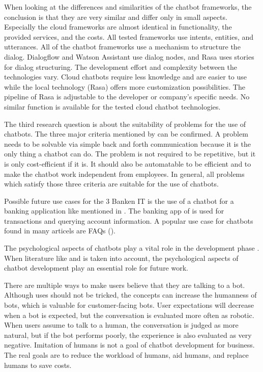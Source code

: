 When looking at the differences and similarities of the chatbot frameworks, the conclusion is that they are very similar and differ only in small aspects.
Especially the cloud frameworks are almost identical in functionality, the provided services, and the costs.
All tested frameworks use intents, entities, and utterances.
All of the chatbot frameworks use a mechanism to structure the dialog.
Dialogflow and Watson Assistant use dialog nodes, and Rasa uses stories for dialog structuring.
The development effort and complexity between the technologies vary.
Cloud chatbots require less knowledge and are easier to use while the local technology (Rasa) offers more customization possibilities.
The pipeline of Rasa is adjustable to the developer or company's specific needs.
No similar function is available for the tested cloud chatbot technologies.

The third research question is about the suitability of problems for the use of chatbots.
The three major criteria mentioned by \citet{singhbuilding} can be confirmed.
A problem needs to be solvable via simple back and forth communication because it is the only thing a chatbot can do.
The problem is not required to be repetitive, but it is only cost-efficient if it is.
It should also be automatable to be efficient and to make the chatbot work independent from employees.
In general, all problems which satisfy those three criteria are suitable for the use of chatbots.

Possible future use cases for the 3 Banken IT is the use of a chatbot for a banking application like mentioned in \citet{singhbuilding}.
The banking app of \citet{singhbuilding} is used for transactions and querying account information.
A popular use case for chatbots found in many articels are FAQs (\citet{evaluateChatbotsShawar2007, buiildChatbotsPython, huang2007extracting, GO2019304}).

The psychological aspects of chatbots play a vital role in the development phase \cite{GO2019304}.
When literature like \citet{folstad2017chatbots, brandtzaeg2018chatbots} and \citet{GO2019304} is taken into account, the psychological aspects of chatbot development play an essential role for future work.

There are multiple ways to make users believe that they are talking to a bot.
Although uses should not be tricked, the concepts can increase the humanness of bots, which is valuable for customer-facing bots.
User expectations will decrease when a bot is expected, but the conversation is evaluated more often as robotic.
When users assume to talk to a human, the conversation is judged as more natural, but if the bot performs poorly, the experience is also evaluated as very negative.
Imitation of humans is not a goal of chatbot development for business.
The real goals are to reduce the workload of humans, aid humans, and replace humans to save costs.

